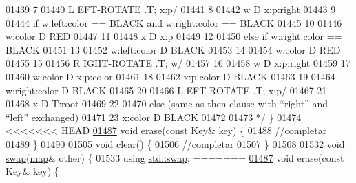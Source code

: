\begin{DoxyCode}
01439 \textcolor{comment}{7}
01440 \textcolor{comment}{L EFT-ROTATE .T; x:p/}
01441 \textcolor{comment}{8}
01442 \textcolor{comment}{w D x:p:right}
01443 \textcolor{comment}{9}
01444 \textcolor{comment}{if w:left:color == BLACK and w:right:color == BLACK}
01445 \textcolor{comment}{10}
01446 \textcolor{comment}{w:color D RED}
01447 \textcolor{comment}{11}
01448 \textcolor{comment}{x D x:p}
01449 \textcolor{comment}{12}
01450 \textcolor{comment}{else if w:right:color == BLACK}
01451 \textcolor{comment}{13}
01452 \textcolor{comment}{w:left:color D BLACK}
01453 \textcolor{comment}{14}
01454 \textcolor{comment}{w:color D RED}
01455 \textcolor{comment}{15}
01456 \textcolor{comment}{R IGHT-ROTATE .T; w/}
01457 \textcolor{comment}{16}
01458 \textcolor{comment}{w D x:p:right}
01459 \textcolor{comment}{17}
01460 \textcolor{comment}{w:color D x:p:color}
01461 \textcolor{comment}{18}
01462 \textcolor{comment}{x:p:color D BLACK}
01463 \textcolor{comment}{19}
01464 \textcolor{comment}{w:right:color D BLACK}
01465 \textcolor{comment}{20}
01466 \textcolor{comment}{L EFT-ROTATE .T; x:p/}
01467 \textcolor{comment}{21}
01468 \textcolor{comment}{x D T:root}
01469 \textcolor{comment}{22}
01470 \textcolor{comment}{else (same as then clause with “right” and “left” exchanged)}
01471 \textcolor{comment}{23 x:color D BLACK}
01472 \textcolor{comment}{}
01473 \textcolor{comment}{   */} \}
01474 
<<<<<<< HEAD
\hypertarget{map2_8h_source_l01487}{}\hyperlink{namespaceaed2_af94e184e6463abb6f7f5237afd0d808a_af94e184e6463abb6f7f5237afd0d808a}{01487}     \textcolor{keywordtype}{void} erase(\textcolor{keyword}{const} Key& key) \{
01488         \textcolor{comment}{//completar}
01489     \}
01490 
\hypertarget{map2_8h_source_l01505}{}\hyperlink{namespaceaed2_ac055546b287d4b50772e8b4e9d188ed2_ac055546b287d4b50772e8b4e9d188ed2}{01505}     \textcolor{keywordtype}{void} \hyperlink{namespaceaed2_ac055546b287d4b50772e8b4e9d188ed2_ac055546b287d4b50772e8b4e9d188ed2}{clear}() \{
01506         \textcolor{comment}{//completar}
01507     \}
01508 
\hypertarget{map2_8h_source_l01532}{}\hyperlink{namespaceaed2_ab24ac4be44835194ce27a61969e4a292_ab24ac4be44835194ce27a61969e4a292}{01532}     \textcolor{keywordtype}{void} \hyperlink{namespaceaed2_ab24ac4be44835194ce27a61969e4a292_ab24ac4be44835194ce27a61969e4a292}{swap}(\hyperlink{classaed2_1_1map}{map}& other) \{
01533         \textcolor{keyword}{using} \hyperlink{namespaceaed2_ab24ac4be44835194ce27a61969e4a292_ab24ac4be44835194ce27a61969e4a292}{std::swap};
=======
\hyperlink{namespaceaed2_af94e184e6463abb6f7f5237afd0d808a_af94e184e6463abb6f7f5237afd0d808a}{01487}     \textcolor{keywordtype}{void} erase(\textcolor{keyword}{const} Key& key) \{

\end{DoxyCode}
